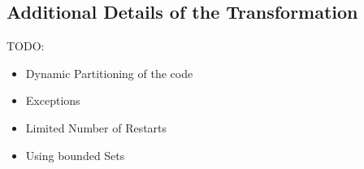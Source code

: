 \subsection{Additional Details of the Transformation}\label{ssec:extendedTran}

TODO:
\begin{itemize}
  \item Dynamic Partitioning of the code
  \item Exceptions
  \item Limited Number of Restarts
  \item Using bounded Sets
\end{itemize}

